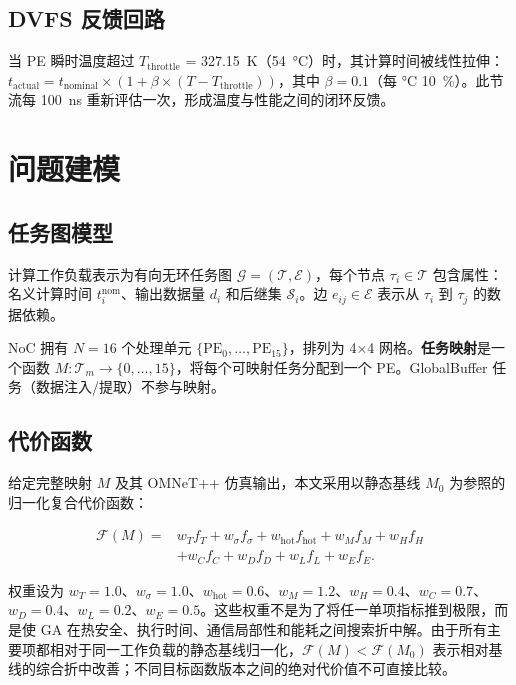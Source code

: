 \documentclass[conference]{IEEEtran}
\begin{document}
\subsection{DVFS 反馈回路}

当 PE 瞬时温度超过 $T_{\text{throttle}}$ = \SI{327.15}{\kelvin}（\SI{54}{\degreeCelsius}）时，其计算时间被线性拉伸：$t_{\text{actual}} = t_{\text{nominal}} \times (1 + \beta \times (T - T_{\text{throttle}}))$，其中 $\beta = 0.1$（每 \si{\degreeCelsius} \SI{10}{\percent}）。此节流每 \SI{100}{\nano\second} 重新评估一次，形成温度与性能之间的闭环反馈。

\section{问题建模}

\subsection{任务图模型}

计算工作负载表示为有向无环任务图 $\mathcal{G} = (\mathcal{T}, \mathcal{E})$，每个节点 $\tau_i \in \mathcal{T}$ 包含属性：名义计算时间 $t_i^{\text{nom}}$、输出数据量 $d_i$ 和后继集 $\mathcal{S}_i$。边 $e_{ij} \in \mathcal{E}$ 表示从 $\tau_i$ 到 $\tau_j$ 的数据依赖。

NoC 拥有 $N = 16$ 个处理单元 $\{\text{PE}_0, \ldots, \text{PE}_{15}\}$，排列为 4$\times$4 网格。\textbf{任务映射}是一个函数 $M: \mathcal{T}_m \rightarrow \{0, \ldots, 15\}$，将每个可映射任务分配到一个 PE。GlobalBuffer 任务（数据注入/提取）不参与映射。

\subsection{代价函数}

给定完整映射 $M$ 及其 OMNeT++ 仿真输出，本文采用以静态基线 $M_0$ 为参照的归一化复合代价函数：

\begin{equation}
\begin{aligned}
\label{eq:cost}
\mathcal{F}(M) ={}& w_T f_T + w_\sigma f_\sigma + w_{\text{hot}} f_{\text{hot}}
+ w_M f_M + w_H f_H \\
&+ w_C f_C + w_D f_D + w_L f_L + w_E f_E .
\end{aligned}
\end{equation}

权重设为 $w_T=1.0$、$w_\sigma=1.0$、$w_{\text{hot}}=0.6$、$w_M=1.2$、$w_H=0.4$、$w_C=0.7$、$w_D=0.4$、$w_L=0.2$、$w_E=0.5$。这些权重不是为了将任一单项指标推到极限，而是使 GA 在热安全、执行时间、通信局部性和能耗之间搜索折中解。由于所有主要项都相对于同一工作负载的静态基线归一化，$\mathcal{F}(M)<\mathcal{F}(M_0)$ 表示相对基线的综合折中改善；不同目标函数版本之间的绝对代价值不可直接比较。
\end{document}
